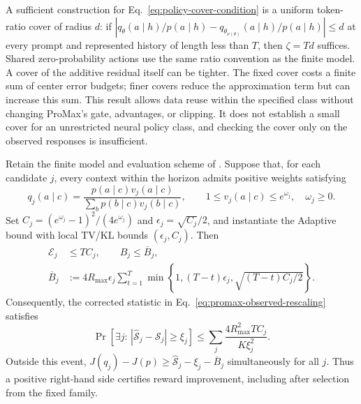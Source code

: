 A sufficient construction for Eq.~\eqref{eq:policy-cover-condition} is a
uniform token-ratio cover of radius $d$: if
$|q_\theta(a\mid h)/p(a\mid h)
 -q_{\theta_{\nu(\theta)}}(a\mid h)/p(a\mid h)|\le d$
at every prompt and represented history of length less than $T$, then
$\zeta=Td$ suffices. Shared zero-probability actions use the same ratio
convention as the finite model. A cover of the additive residual itself can
be tighter. The fixed cover costs a finite sum of center error budgets;
finer covers reduce the approximation term but can increase this sum.
This result allows data reuse within the specified class without changing
ProMax's gate, advantages, or clipping. It does not establish a small cover
for an unrestricted neural policy class, and checking the cover only on the
observed responses is insufficient.

\begin{corollary}
\label{cor:logit-calibration}
Retain the finite model and evaluation scheme of
. Suppose that, for each candidate $j$,
every context within the horizon admits positive weights satisfying
\begin{equation}
    q_j(a\mid c)=\frac{p(a\mid c)v_j(a\mid c)}
      {\sum_b p(b\mid c)v_j(b\mid c)},
    \qquad 1\le v_j(a\mid c)\le e^{\omega_j},\quad \omega_j\ge0.
    \label{eq:logit-tilt-envelope}
\end{equation}
Set $C_j=(e^{\omega_j}-1)^2/(4e^{\omega_j})$ and
$\epsilon_j=\sqrt{C_j}/2$, and instantiate the Adaptive bound with local
TV/KL bounds $(\epsilon_j,C_j)$. Then
\begin{align}
    \mathcal E_j&\le TC_j,\qquad B_j\le\overline B_j,
      \label{eq:logit-certificate-inputs}\\
    \overline B_j&:=4R_{\max}\epsilon_j\sum_{t=1}^{T}
      \min\!\left\{1,(T-t)\epsilon_j,
                         \sqrt{(T-t)C_j/2}\right\}.
      \nonumber
\end{align}
Consequently, the corrected statistic in
Eq.~\eqref{eq:promax-observed-rescaling} satisfies
\begin{equation}
    \Pr\!\left[\exists j:\,
      |\widehat{\mathcal S}_j-\mathcal S_j|\ge\xi_j\right]
    \le\sum_j\frac{4R_{\max}^2TC_j}{K\xi_j^2}.
    \label{eq:logit-confidence}
\end{equation}
Outside this event, $J(q_j)-J(p)\ge
\widehat{\mathcal S}_j-\xi_j-\overline B_j$ simultaneously for all $j$.
Thus a positive right-hand side certifies reward improvement, including
after selection from the fixed family.
\end{corollary}

